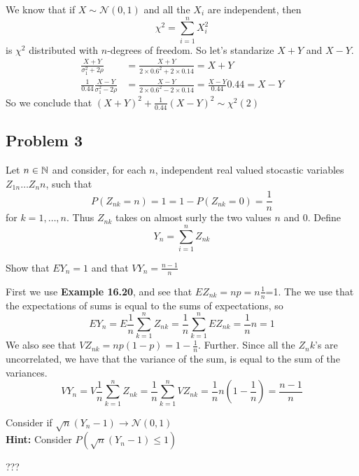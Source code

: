 \begin{solution}
We know that if \(X\sim \mathcal{N}(0,1)\) and all the \(X_i\) are independent, then
\[
	\chi^2=\sum_{i=1}^n X^2_i
\]
is \(\chi^2\) distributed with \(n\)-degrees of freedom. So let's standarize \(X+Y\) and \(X-Y\).
\begin{align}
     \frac{X+Y}{\sigma_1^2+2\rho}&=\frac{X+Y}{2\times0.6^2+2\times 0.14}=X+Y \\
     \frac{1}{0.44}\frac{X-Y}{\sigma_1^2-2\rho}&=\frac{X-Y}{2\times0.6^2-2\times 0.14}=\frac{X-Y}{0.44}0.44=X-Y
 \end{align}
So we conclude that \((X+Y)^2+\frac{1}{0.44}(X-Y)^2\sim\chi^2(2)\)
\end{solution}
\subsection{Problem 3} %
\label{sub:problem_3}
Let \(n\in {\mathbb{N}}\) and consider, for each \(n\), independent real valued stocastic variables \(Z_{1n}\ldots Z_nn\), such that
\[
	P(Z_{nk}=n)=1=1-P(Z_{nk}=0)=\frac{1}{n}
\]
for \(k=1,\ldots,n\). Thus \(Z_{nk}\) takes on almost surly the two values \(n\) and \(0\). Define
\[
 	Y_n=\sum_{i=1}^nZ_{nk}
 \]
 \begin{problem}
 Show that \(EY_n=1\) and that \(VY_n=\frac{n-1}{n} \)
 \end{problem}
\begin{solution}
First we use \textbf{Example 16.20}, and see that \(EZ_{nk}=np=n\frac{1}{n}\)=1. The we use that the expectations of sums is equal to the sums of expectations, so
\[
	EY_n=E \frac{1}{n}\sum_{k=1}^n Z_{nk}=\frac{1}{n}\sum_{k=1}^n EZ_{nk}=\frac{1}{n}n=1
\]
We also see that \(VZ_{nk}=np(1-p)=1-\frac{1}{n}\). Further. Since all the \(Z_nk\)'s are uncorrelated, we have that the variance of the sum, is equal to the sum of the variances.
\[
	VY_n=V \frac{1}{n}\sum_{k=1}^n Z_{nk}=\frac{1}{n}\sum_{k=1}^n VZ_{nk}=\frac{1}{n}n(1-\frac{1}{n})=\frac{n-1}{n}
\]

\end{solution}
\begin{problem}
Consider if \(\sqrt{n}(Y_n-1) \rightarrow \mathcal{N}(0,1)\) \\
\textbf{Hint:} Consider \(P(\sqrt{n}(Y_n-1) \leq1) \)
\end{problem}
\begin{solution}
???
\end{solution}

